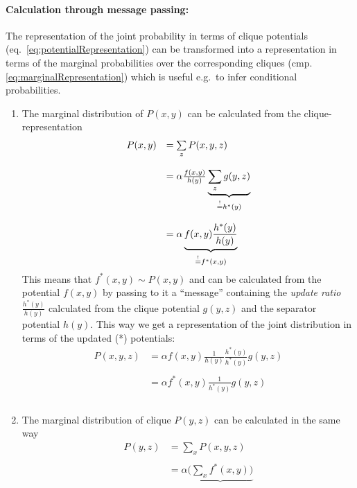 \paragraph{Calculation through message passing:}The representation of
the joint probability in terms of clique potentials
(eq.~\ref{eq:potentialRepresentation}) can be transformed into a
representation in terms of the marginal probabilities over the
corresponding cliques (cmp. \ref{eq:marginalRepresentation}) which is
useful e.g.\ to infer conditional probabilities.
\begin{enumerate}[(1)]
\item The marginal distribution of $P(x,y)$ can be calculated from the
  clique-representation
 \begin{equation}
	\begin{array}{ll}
		P(x,y) 
		& = \sum\limits_{z} P(x,y,z) \\\\
		& = \alpha \frac{f(x,y)}{h(y)} \underbrace{
			\sum\limits_{z} g(y,z)}_{\stackrel{\mathrm{!}}{=} h^*(y)} \\\\
		& = \alpha \underbrace{ f(x,y) \frac{h^*(y)}{h(y)} }_{
			\stackrel{\mathrm{!}}{=} f^*(x,y)}
	\end{array}
\end{equation}
This means that $f^*(x,y) \sim P(x,y)$ and can be calculated from the
potential $f(x,y)$ by passing to it a ``message'' containing the \emph{update ratio}
$\frac{h^*(y)}{h(y)}$ calculated from the clique potential $g(y,z)$
and the separator potential $h(y)$. This way we get a representation
of the joint distribution in terms of the updated (*) potentials: 
\begin{equation}
	\begin{array}{ll}
		P(x,y,z) 
		& = \alpha f(x,y) \frac{1}{h(y)} \frac{h^*(y)}{h^*(y)} 
			g(y,z)\\\\
		& = \alpha f^*(x,y) \frac{1}{h^*(y)}g(y,z)\\\\
	\end{array}
\end{equation}
\item The marginal distribution of clique $P(y,z)$ can be calculated in the same way
\begin{equation}
	\begin{array}{ll}
		P(y,z) 
		& = \sum\limits_x P(x,y,z) \\\\
		& = \alpha \underbrace{\bigg(\sum\limits_x f^*(x,y) \bigg)}_{
}
\end{array}
\end{equation}
\end{enumerate}
